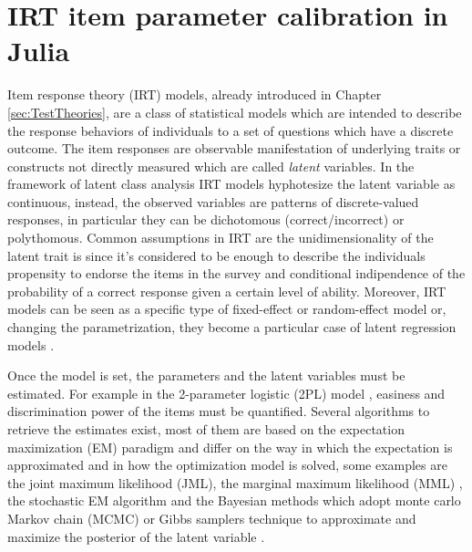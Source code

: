 \label{key}%

\chapter{IRT item parameter calibration in Julia} %
\label{sec:Julia}

Item response theory (IRT) models, already introduced in Chapter \ref{sec:TestTheories}, are a class of statistical models which are intended to describe the response behaviors of individuals to a set of questions which have a discrete outcome. The item responses are observable manifestation of underlying traits or constructs not directly measured which are called \emph{latent} variables. In the framework of latent class analysis IRT models hyphotesize the latent variable as continuous, instead, the observed variables are patterns of discrete-valued responses, in particular they can be dichotomous (correct/incorrect) or polythomous. Common assumptions in IRT are the unidimensionality of the latent trait is  since it's considered to be enough to describe the individuals propensity to endorse the items in the survey and conditional indipendence of the probability of a correct response given a certain level of ability. Moreover, IRT models can be seen as a specific type of fixed-effect or random-effect model \parencite{fox2006fixed} or, changing the parametrization, they become a particular case of latent regression models \parencite{von2010stochastic}. 

Once the model is set, the parameters and the latent variables must be estimated. For example in the 2-parameter logistic (2PL) model \parencite{BockMislevy1982}, easiness and discrimination power of the items must be quantified. Several algorithms to retrieve the estimates exist, most of them are based on the expectation maximization (EM) paradigm and differ on the way in which the expectation is approximated and in how the optimization model is solved, some examples are the joint maximum likelihood (JML)\parencite{lord1968statistical}, the marginal maximum likelihood (MML) \parencite{drasgow1989evaluation}, the stochastic EM algorithm \parencite{fox2003stochastic} and the Bayesian methods which adopt monte carlo Markov chain (MCMC) or Gibbs samplers technique to approximate and maximize the posterior of the latent variable \parencite{matteucci2012prior}. 

